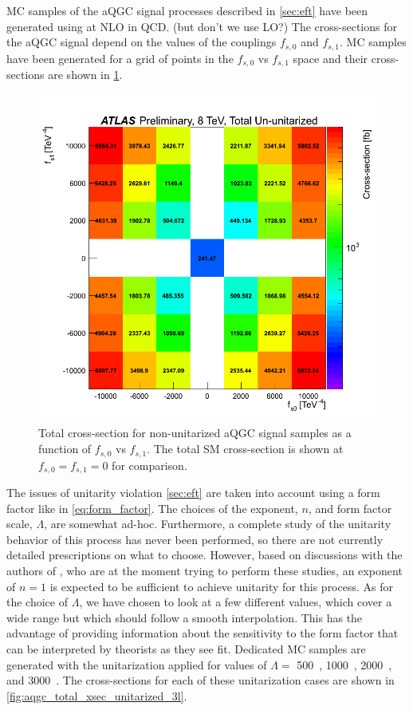 
MC samples of the aQGC signal processes described in \sec\ref{sec:eft}
have been generated using \vbfnlo at NLO in QCD.  (but don't we use LO?)
The cross-sections for the aQGC signal depend on the values
of the couplings $f_{s,0}$ and $f_{s,1}$. MC samples have 
been generated for a grid of points in the $f_{s,0}$ vs $f_{s,1}$ space
and their cross-sections are shown in \fig\ref{fig:aqgc_total_xsec_ununitarized_3l}. %

\begin{figure}[ht!]
\centering
\includegraphics[width=.8\textwidth]{figures/aQGC/total_xsec/www_3l_aqgc_total_ununitarized_noratio.png}
\caption{Total cross-section for non-unitarized aQGC signal samples as a function of $f_{s,0}$ vs $f_{s,1}$.
The total SM cross-section is shown at $f_{s,0}=f_{s,1}=0$ for comparison.}
\label{fig:aqgc_total_xsec_ununitarized_3l}
\end{figure}

The issues of unitarity violation \sec\ref{sec:eft} are taken
into account using a form factor like in \eqn\eqref{eq:form_factor}.
The choices of the exponent, $n$, and form factor scale, $\Lambda$, 
are somewhat ad-hoc. Furthermore, a complete study of the unitarity
behavior of this process has never been performed, so there are not
currently detailed prescriptions on what to choose. 
However, based on discussions with the authors of \vbfnlo, who
are at the moment trying to perform these studies, an exponent
of $n=1$ is expected to be sufficient to achieve unitarity 
for this process.  As for the choice of $\Lambda$, we have
chosen to look at a few different values, which cover a wide
range but which should follow a smooth interpolation. 
This has the advantage of providing information about the
sensitivity to the form factor that can be interpreted 
by theorists as they see fit. Dedicated MC samples
are generated with the unitarization applied for values
of $\Lambda =$ 500~\GeV, 1000~\GeV, 2000~\GeV, and 3000~\GeV.
The cross-sections for each of these unitarization cases
are shown in \fig\ref{fig:aqgc_total_xsec_unitarized_3l}.

